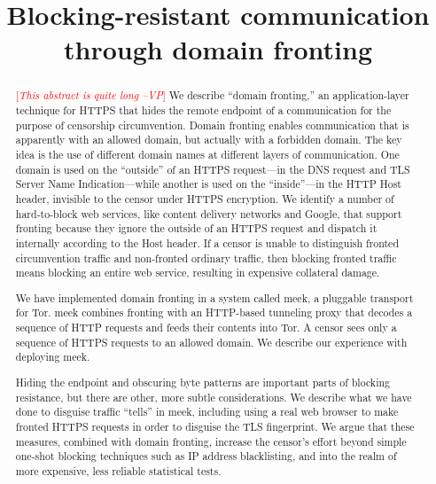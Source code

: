 \documentclass{sig-alternate}
\newcommand{\meek}{meek\xspace}
\newcommand{\note}[1]{{\textcolor{red}{[\textit{#1}]}}}
\newcommand{\vp}[1]{\note{#1 --VP}}
\begin{document}
\title{Blocking-resistant communication\\through domain fronting}


\maketitle

\begin{abstract}
\vp{This abstract is quite long}
We describe ``domain fronting,'' an application-layer technique
for HTTPS
that hides the remote endpoint of a communication
for the purpose of censorship circumvention.
Domain fronting enables communication that is apparently with an allowed domain,
but actually with a forbidden domain.
The key idea is the use of different domain names at different layers of communication.
One domain is used on the ``outside'' of an HTTPS request---in the DNS request and
TLS Server Name Indication---while another is used
on the ``inside''---in the HTTP Host header, invisible to the
censor under HTTPS encryption.
We identify a number of hard-to-block web services,
like content delivery networks and Google,
that support fronting because they ignore the outside of an HTTPS request
and dispatch it internally according to the Host header.
If a censor is unable to distinguish fronted circumvention traffic and non-fronted ordinary traffic,
then blocking fronted traffic means blocking an entire web service,
resulting in expensive collateral damage.

We have implemented domain fronting in a system called \meek,
a pluggable transport for Tor.
\meek combines
fronting with an HTTP-based tunneling proxy
that decodes a sequence of HTTP requests and feeds their contents into Tor.
A censor sees only a sequence of HTTPS requests to an allowed domain.
We describe our experience with deploying \meek.

Hiding the endpoint and obscuring byte patterns are important parts of blocking resistance,
but there are other, more subtle considerations.
We describe what we have done to disguise traffic ``tells'' in \meek,
including using a real web browser to make fronted HTTPS requests
in order to disguise the TLS fingerprint.
We argue that these measures, combined with domain fronting, increase the censor's effort
beyond simple one-shot blocking techniques such as IP address blacklisting, and into
the realm of more expensive, less reliable statistical tests.
\end{abstract}
\end{document}
